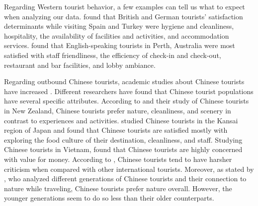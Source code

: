 \documentclass[smallextended,natbib]{svjour3}       %
\begin{document}
    Regarding Western tourist behavior, a few examples can tell us what to expect when analyzing our data. \cite{kozak2002} found that British and German tourists' satisfaction determinants while visiting Spain and Turkey were hygiene and cleanliness, hospitality, the availability of facilities and activities, and accommodation services. \cite{shanka2004} found that English-speaking tourists in Perth, Australia were most satisfied with staff friendliness, the efficiency of check-in and check-out, restaurant and bar facilities, and lobby ambiance. 

    Regarding outbound Chinese tourists, academic studies about Chinese tourists have increased \cite[][]{sun2017}. Different researchers have found that Chinese tourist populations have several specific attributes. According to \cite{ryan2001} and their study of Chinese tourists in New Zealand, Chinese tourists prefer nature, cleanliness, and scenery in contrast to experiences and activities. \cite{dongyang2015} studied Chinese tourists in the Kansai region of Japan and found that Chinese tourists are satisfied mostly with exploring the food culture of their destination, cleanliness, and staff. Studying Chinese tourists in Vietnam, \cite{truong2009} found that Chinese tourists are highly concerned with value for money. According to \cite{liu2019}, Chinese tourists tend to have harsher criticism when compared with other international tourists. Moreover, as stated by \cite{gao2017chinese}, who analyzed different generations of Chinese tourists and their connection to nature while traveling, Chinese tourists prefer nature overall. However, the younger generations seem to do so less than their older counterparts. 
\end{document}
